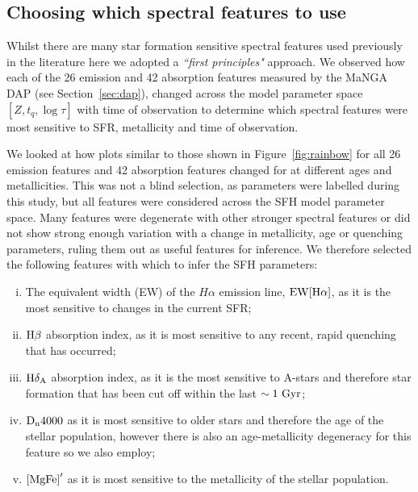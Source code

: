 \documentclass[useAMS,usenatbib]{mn2e}
\def\referee		{\color{refer}}
\begin{document}
\subsection{Choosing which spectral features to use}\label{sec:choosespf}

Whilst there are many star formation sensitive spectral features used previously in the literature \citep[see comprehensive review by][]{kennevans12} here we adopted a \emph{``first principles"} approach. We observed how each of the 26 emission and 42 absorption features measured by the MaNGA DAP (see Section~\ref{sec:dap}), changed across the model parameter space $[Z, t_q, \log \tau]$ with time of observation to determine which spectral features were most sensitive to SFR, metallicity and time of observation. 

We looked at how plots similar to those shown in Figure~\ref{fig:rainbow} for all 26 emission features and 42 absorption features changed for at different ages and metallicities. This was not a blind selection, as parameters were labelled during this study, but all features were considered across the SFH model parameter space. Many features were degenerate with other stronger spectral features or did not show strong enough variation with a change in metallicity, age or quenching parameters, ruling them out as useful features for inference. We therefore selected the following features with which to infer the SFH parameters:
\begin{enumerate}[(i)]
\item The equivalent width (EW) of the $H\alpha$ emission line, $\rm{EW}[H\alpha]$, as it is the most sensitive to {\referee changes} in the current SFR;


\item $\rm{H}\beta$ absorption index, as it is most sensitive to any recent, rapid quenching that has occurred;

\item $\rm{H}\delta_A$ absorption index, as it is the most sensitive to A-stars and therefore star formation that has been cut off within the last $\sim1~\rm{Gyr}$;

\item $\rm{D}_n4000$ as it is most sensitive to older stars and therefore the age of the stellar population, however there is also an age-metallicity degeneracy for this feature so we also employ;

\item $\rm{[MgFe]}^{\prime}$ as it is most sensitive to the metallicity of the stellar population.

\end{enumerate}
\end{document}
